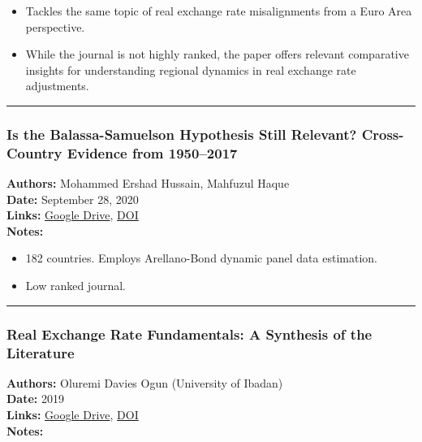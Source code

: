 \documentclass[
  11pt,
]{article}
\providecommand{\tightlist}{%
  \setlength{\itemsep}{0pt}\setlength{\parskip}{0pt}}
\begin{document}
\begin{itemize}
\tightlist
\item
  Tackles the same topic of real exchange rate misalignments from a Euro
  Area perspective.
\item
  While the journal is not highly ranked, the paper offers relevant
  comparative insights for understanding regional dynamics in real
  exchange rate adjustments.
\end{itemize}

\begin{center}\rule{0.5\linewidth}{0.5pt}\end{center}

\subsubsection{Is the Balassa-Samuelson Hypothesis Still Relevant?
Cross-Country Evidence from
1950--2017}\label{is-the-balassa-samuelson-hypothesis-still-relevant-cross-country-evidence-from-19502017}

\textbf{Authors:} Mohammed Ershad Hussain, Mahfuzul Haque\\
\textbf{Date:} September 28, 2020\\
\textbf{Links:}
\href{https://drive.google.com/file/d/1UOk4LsRAddTO--0tr4ulynOaXQht7Agv/view?usp=sharing}{Google
Drive}, \href{https://doi.org/10.1453/jepe.v7i3.2096}{DOI}\\
\textbf{Notes:}

\begin{itemize}
\tightlist
\item
  182 countries. Employs Arellano-Bond dynamic panel data estimation.
\item
  Low ranked journal.
\end{itemize}

\begin{center}\rule{0.5\linewidth}{0.5pt}\end{center}

\subsubsection{Real Exchange Rate Fundamentals: A Synthesis of the
Literature}\label{real-exchange-rate-fundamentals-a-synthesis-of-the-literature}

\textbf{Authors:} Oluremi Davies Ogun (University of Ibadan)\\
\textbf{Date:} 2019\\
\textbf{Links:}
\href{https://drive.google.com/file/d/1SIhMMtsybhiY3eJg-oGcCAvoqJPDKXtQ/view?usp=sharing}{Google
Drive}, \href{https://doi.org/10.6000/1929-7092.2019.08.36}{DOI}\\
\textbf{Notes:}
\end{document}
